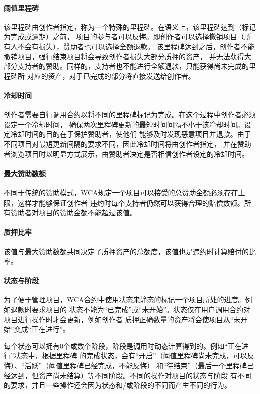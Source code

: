 \paragraph{阈值里程碑}

该里程碑由创作者指定，称为一个特殊的里程碑。在语义上，该里程碑达到（标记为完成或逾期）之前，
项目的参与者可以反悔。即创作者可以选择撤销项目（所有人不会有损失），赞助者也可以选择全额退款。
该里程碑达到之后，创作者不能撤销项目，强行结束项目将会导致创作者损失大部分质押的资产，
并无法获得大部分支持者的赞助。同样的，支持者也不能进行全额退款，只能获得尚未完成的里程碑所
对应的资产，对于已完成的部分将直接发送给创作者。

\paragraph{冷却时间}

创作者需要自行调用合约以将不同的里程碑标记为完成。在这个过程中创作者必须设定一个冷却时间，
确保两次里程碑更新的最短时间间隔不小于该冷却时间。设定冷却时间的目的在于保护赞助者，使他们
能够及时发现恶意项目并退款。由于不同项目对最短更新间隔的要求不同，因此冷却时间将由创作者指定，
并在赞助者浏览项目时以明显方式展示，由赞助者决定是否相信创作者设定的冷却时间。

\paragraph{最大赞助数额}

不同于传统的赞助模式，WCA规定一个项目可以接受的总赞助金额必须存在上限，这样才能够保证创作者
违约时每个支持者仍然可以获得合理的赔偿数额。所有赞助者对项目的赞助金额不能超过该值。

\paragraph{质押比率}

该值与最大赞助数额共同决定了质押资产的总额度，该值也是违约时计算赔付的比率。

\paragraph{状态与阶段}

为了便于管理项目，WCA合约中使用状态来静态的标记一个项目所处的进度。例如退款时要求项目的
状态不能为“已完成”或“未开始”。状态仅在用户调用合约对项目进行操作时才会更新，例如创作者
质押正确数量的资产将会使项目从“未开始”变成“正在进行”。

每个状态可以拥有0个或数个阶段，阶段是调用时动态计算得到的。例如“正在进行”状态中，根据里程碑
的完成状态，会有“开启”（阈值里程碑尚未完成，可以反悔）、“活跃”（阈值里程碑已经完成，不能反悔）
和“待结束”（最后一个里程碑已经达到，但资产尚未结算）等不同阶段。不同的操作对项目的状态与阶段
有不同的要求，并且一些操作还会因为状态和/或阶段的不同而产生不同的行为。

